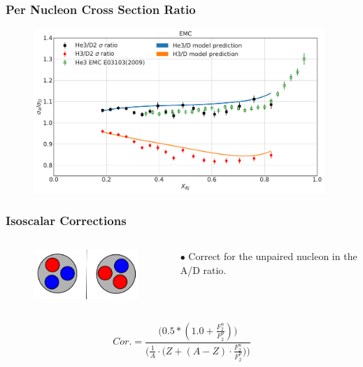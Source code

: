 \documentclass[12pt]{beamer}
\begin{document}
\begin{frame}{}
\frametitle{Per Nucleon Cross Section Ratio}
\begin{figure}
	\includegraphics[width=11cm]{../images/EMC.pdf}
\end{figure}

\end{frame}

\begin{frame}{}
\frametitle{Isoscalar Corrections}
\vspace*{-1cm}
\begin{columns}
	\begin{figure}
		\includegraphics[width =5cm]{../images/mirror}
	\end{figure}
	$\bullet$ Correct for the unpaired nucleon in the A/D ratio.	
\end{columns}
\begin{equation}
Cor. = \frac{\Big(0.5*(1.0 + \frac{F_2^n}{F_2^p})\Big)}{ \Big(\frac{1}{A} \cdot \big(Z+(A-Z)\cdot \frac{F_2^n}{F_2^p}\big) \Big) }\nonumber
\end{equation}

\end{frame}
\end{document}
